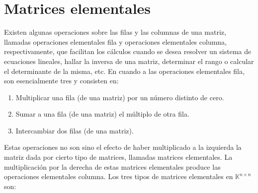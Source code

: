 \documentclass[b5paper, 11pt]{book}
\newcommand{\0}{\mathbf{0}}
\newcommand{\K}{\mathds{K}}
\theoremstyle{estiloB}
\theoremstyle{estiloC}
\theoremstyle{estiloD}
\theoremstyle{estiloE}
\begin{document}
\section{Matrices elementales}
Existen algunas operaciones sobre las filas y las columnas de una matriz, llamadas operaciones elementales fila y operaciones elementales columna, respectivamente, que facilitan los c\'{a}lculos cuando se desea resolver un sistema de ecuaciones lineales, hallar la inversa de una matriz, determinar el rango o calcular el determinante de la misma, etc. En cuando a las operaciones elementales fila, son esencialmente tres y consisten en:
\begin{enumerate}
\item Multiplicar una fila (de una matriz) por un n\'{u}mero distinto de cero.
\item Sumar a una fila (de una matriz) el m\'{u}ltiplo de otra fila.
\item Intercambiar dos filas (de una matriz).
\end{enumerate}
Estas operaciones no son sino el efecto de haber multiplicado a la izquierda la matriz dada por cierto tipo de matrices, llamadas matrices elementales. La multiplicaci\'{o}n  por la derecha de estas matrices elementales produce las operaciones elementales columna. Los tres tipos de matrices elementales en $\K^{n \times n}$ son:
\end{document}
